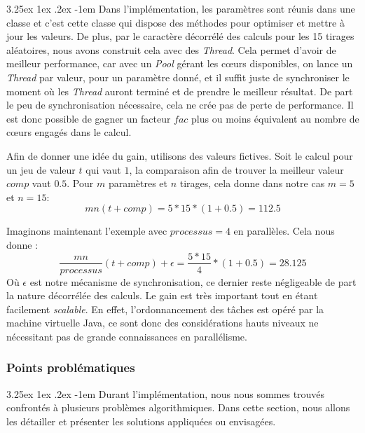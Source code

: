 \documentclass[a4paper, 11pt]{article}
\makeatletter
\renewcommand\paragraph{\@startsection{paragraph}{5}{\z@}%
  {3.25ex \@plus1ex \@minus.2ex}%
  {-1em}%
  {\normalfont\normalsize\bfseries}}
\makeatother
\begin{document}
\paragraph{}
Dans l'implémentation, les paramètres sont réunis dans une classe et c'est cette classe qui dispose des méthodes pour optimiser et mettre à 
jour les valeurs. De plus, par le caractère décorrélé des calculs pour les 15 tirages aléatoires, nous avons construit cela avec des \textit{Thread}. Cela
permet d'avoir de meilleur performance, car avec un \textit{Pool} gérant les cœurs disponibles, on lance un \textit{Thread} par valeur, pour un 
paramètre donné, et il suffit juste de synchroniser le moment
où les \textit{Thread} auront terminé et de prendre le meilleur résultat. De part le peu de synchronisation nécessaire, cela ne crée pas de perte de
performance. Il est donc possible de gagner un facteur $fac$ plus ou moins équivalent au nombre de cœurs engagés dans le calcul.

Afin de donner une idée du gain, utilisons des valeurs fictives. Soit le calcul pour un jeu de valeur $t$ qui vaut $1$, la comparaison afin de trouver la meilleur valeur $comp$ vaut $0.5$.
Pour $m$ paramètres et $n$ tirages, cela donne dans notre cas $m=5$ et $n=15$:
$$m n (t + comp) = 5 * 15 * (1 + 0.5) = 112.5$$

Imaginons maintenant l'exemple avec $processus=4$ en parallèles. Cela nous donne :
$$ \frac{m n}{processus} (t + comp) + \epsilon = \frac{5 * 15}{4} * (1 + 0.5) = 28.125$$
Où $\epsilon$ est notre mécanisme de synchronisation, ce dernier reste négligeable de part la nature décorrélée des calculs.
Le gain est très important tout en étant facilement \textit{scalable}. En effet, l'ordonnancement des tâches est opéré par la machine virtuelle Java, ce sont donc des considérations hauts niveaux ne nécessitant pas de grande connaissances en parallélisme.

\subsubsection{Points problématiques}
\paragraph{}
Durant l'implémentation, nous nous sommes trouvés confrontés à plusieurs problèmes algorithmiques. Dans cette section, nous allons les détailler et présenter les solutions appliquées ou envisagées.
\end{document}
